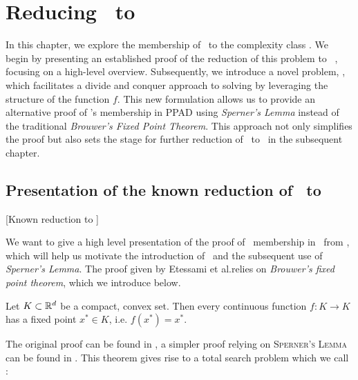 \setchapterpreamble[u]{\margintoc}
\chapter{Reducing \Tarski\ to \PPAD}

In this chapter, we explore the membership of \Tarski\ to the complexity class \PPAD. We begin by presenting an established proof of the reduction of this problem to \Brouwer~, focusing on a high-level overview. Subsequently, we introduce a novel problem, \Tarskistar, which facilitates a divide and conquer approach to solving \Tarski by leveraging the structure of the function $f$. This new formulation allows us to provide an alternative proof of \Tarski’s membership in PPAD using \textit{Sperner's Lemma} instead of the traditional \textit{Brouwer's Fixed Point Theorem}. This approach not only simplifies the proof but also sets the stage for further reduction of \Tarskistar\ to \EOPL\ in the subsequent chapter.

\section{Presentation of the known reduction of \Tarski\ to \PPAD}[Known reduction to \PPAD]

We want to give a high level presentation of the proof of \Tarski\ membership in \PPAD\ from , which will help us motivate the introduction of \Tarskistar\ and the subsequent use of \textit{Sperner's Lemma}. The proof given by Etessami et al.\@ relies on \textit{Brouwer's fixed point theorem}, which we introduce below.

\begin{theorem}
    Let $K \subset \mathbb{R}^d$ be a compact, convex set. Then every continuous function $f : K \rightarrow K$ has a fixed point $x^*	\in K$, i.e. $f(x^*) = x^*$.
\end{theorem}

The original proof can be found in , a simpler proof relying on \textsc{Sperner's Lemma} can be found in . This theorem gives rise to a total search problem which we call \Brouwer:



